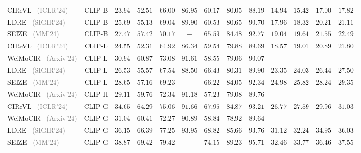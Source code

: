 \begin{table*}
\begin{tabular}{l|c|cccc|ccc|cccc}
    CIReVL~\cite{cirevl} \footnotesize{\textcolor{gray}{(ICLR'24)}}& CLIP-B & $23.94$ & $52.51$ & $66.00$ & $86.95$ & $60.17$ & $80.05$ & $88.19$ & $14.94$ & $15.42$ & $17.00$ & $17.82$\\
    LDRE~\cite{ldre} \footnotesize{\textcolor{gray}{(SIGIR'24)}} & CLIP-B & $25.69$ & $55.13$ & $69.04$ & $89.90$ & $60.53$ & $80.65$ & $90.70$ & $17.96$ & $18.32$ & $20.21$ & $21.11$\\
    SEIZE~\cite{seize} \footnotesize{\textcolor{gray}{(MM'24)}} & CLIP-B & $27.47$ & $57.42$ & $70.17$ & $-$ & $65.59$ & $84.48$ & $92.77$ & $19.04$ & $19.64$ & $21.55$ & $22.49$\\
    CIReVL~\cite{cirevl} \footnotesize{\textcolor{gray}{(ICLR'24)}}& CLIP-L & $24.55$ & $52.31$ & $64.92$ & $86.34$ & $59.54$ & $79.88$ & $89.69$ & $18.57$ & $19.01$ & $20.89$ & $21.80$\\
    WeiMoCIR~\cite{weimocir} \footnotesize{\textcolor{gray}{(Arxiv'24)}} & CLIP-L & $30.94$ & $60.87$ & $73.08$ & $91.61$ & $58.55$ & $79.06$ & $90.07$ & $-$ & $-$ & $-$ & $-$\\
    LDRE~\cite{ldre} \footnotesize{\textcolor{gray}{(SIGIR'24)}} & CLIP-L & $26.53$ & $55.57$ & $67.54$ & $88.50$ & $66.43$ & $80.31$ & $89.90$ & $23.35$ & $24.03$ & $26.44$ & $27.50$\\
    SEIZE~\cite{seize} \footnotesize{\textcolor{gray}{(MM'24)}} & CLIP-L & $28.65$ & $57.16$ & $69.23$ & $-$ & $66.22$ & $84.05$ & $92.34$ & $24.98$ & $25.82$ & $28.24$ & $29.35$\\
    WeiMoCIR~\cite{weimocir} \footnotesize{\textcolor{gray}{(Arxiv'24)}} & CLIP-H & $29.11$ & $59.76$ & $72.34$ & $91.18$ & $57.23$ & $79.08$ & $89.76$ & $-$ & $-$ & $-$ & $-$\\
    CIReVL~\cite{cirevl} \footnotesize{\textcolor{gray}{(ICLR'24)}}& CLIP-G & $34.65$ & $64.29$ & $75.06$ & $91.66$ & $67.95$ & $84.87$ & $93.21$ & $26.77$ & $27.59$ & $29.96$ & $31.03$\\
    WeiMoCIR~\cite{weimocir} \footnotesize{\textcolor{gray}{(Arxiv'24)}} & CLIP-G & $31.04$ & $60.41$ & $72.27$ & $90.89$ & $58.84$ & $78.92$ & $89.64$ & $-$ & $-$ & $-$ & $-$\\
    LDRE~\cite{ldre} \footnotesize{\textcolor{gray}{(SIGIR'24)}} & CLIP-G & $36.15$ & $66.39$ & $77.25$ & $93.95$ & $68.82$ & $85.66$ & $93.76$ & $31.12$ & $32.24$ & $34.95$ & $36.03$\\
    SEIZE~\cite{seize} \footnotesize{\textcolor{gray}{(MM'24)}} & CLIP-G & $38.87$ & $69.42$ & $79.42$ & $-$ & $74.15$ & $89.23$ & $95.71$ & $32.46$ & $33.77$ & $36.46$ & $37.55$\\

\end{tabular}
\end{table*}
